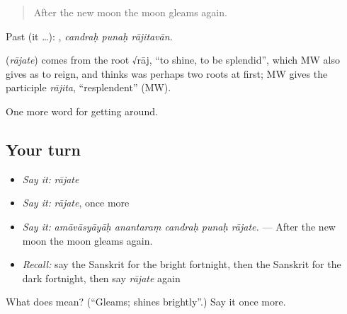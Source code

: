\begin{quote}
After the new moon the moon gleams again.
\end{quote}

Past (it …):   , \emph{candraḥ punaḥ rājitavān}.

\begin{cousinweb}
\textbf{} (\emph{rājate}) comes from the root √rāj, \textquotedblleft{}to shine, to be splendid\textquotedblright{}, which MW also gives as to reign, and thinks was perhaps two roots at first; MW gives the participle \emph{rājita}, \textquotedblleft{}resplendent\textquotedblright{} (MW).
\end{cousinweb}

\begin{grammarlens}[title={What you've built}]
One more word for getting around.
\end{grammarlens}

\subsection*{Your turn}
\begin{itemize}
\raggedright
  \item \emph{Say it:} \emph{rājate}
  \item \emph{Say it:} \emph{rājate}, once more
  \item \emph{Say it:} \emph{amāvāsyāyāḥ anantaraṃ candraḥ punaḥ rājate.} — After the new moon the moon gleams again.
  \item \emph{Recall:} say the Sanskrit for the bright fortnight, then the Sanskrit for the dark fortnight, then say \emph{rājate} again
\end{itemize}

\begin{tcolorbox}[breakable,colback=teal!4,colframe=teal!35!black,title={Before you move on}]
What does  mean? (\textquotedblleft{}Gleams; shines brightly\textquotedblright{}.) Say it once more.
\end{tcolorbox}
